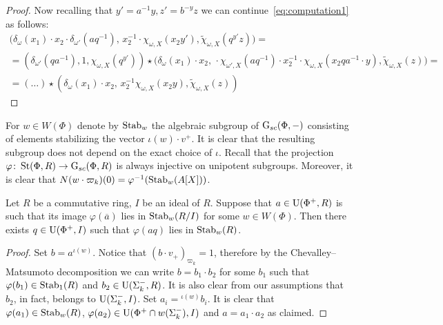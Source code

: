 \begin{proof}
Now recalling that $y' = a ^{-1} y, z' = b^{-y} z$ we can continue~\eqref{eq:computation1} as follows:
\begin{multline*}
 \bigl(\delta_\omega(x_1) \cdot x_2 \cdot \delta_{\omega'}(aq^{-1}),\, x_2^{-1}\cdot \chi_{\omega, X}(x_2 y'), \widetilde{\chi}_{\omega, X}(q^{y'} z) \bigr) = \\ = (\delta_{\omega'}(qa^{-1}), 1, \chi_{\omega, X}(q^{y'})) \star \bigl(\delta_\omega(x_1) \cdot x_2,\, \cdot \chi_{\omega', X}(aq^{-1}) \cdot x_2^{-1}\cdot \chi_{\omega, X}(x_2 q a^{-1} \cdot y ), \widetilde{\chi}_{\omega, X}(z) \bigr) = \\ = (\ldots) \star (\delta_\omega(x_1) \cdot x_2,\, x_2^{-1} \chi_{\omega, X}(x_2y), \widetilde{\chi}_{\omega, X}(z)) \end{multline*} \end{proof}


 For $w\in W(\Phi)$ denote by $\operatorname{Stab}_{w}$ the algebraic subgroup of $\operatorname{G}_{sc}(\Phi, -)$ consisting of elements stabilizing the vector $\iota(w) \cdot v^+$. It is clear that the resulting subgroup does not depend on the exact choice of $\iota$. Recall that the projection $\varphi \colon \operatorname{St}(\Phi, R) \to \operatorname{G}_{sc}(\Phi, R)$ is always injective on unipotent subgroups. Moreover, it is clear that $N(w \cdot \varpi_k)(0) = \varphi^{-1}(\operatorname{Stab}_w(A[X]))$.

\begin{lemma} \label{lem:q}
Let $R$ be a commutative ring, $I$ be an ideal of $R$.
Suppose that $a \in \operatorname{U}(\Phi^+, R)$ is such that its image $\varphi(\overline{a})$ lies in $\operatorname{Stab}_{w}(R/I)$ for some $w \in W(\Phi)$.
Then there exists $q \in \operatorname{U}(\Phi^+, I)$ such that $\varphi(aq)$ lies in $\operatorname{Stab}_{w}(R)$.
\end{lemma}
\begin{proof}
Set $b = a^{\iota(w)}$.
Notice that $(b \cdot v_+)_{\varpi_k} = 1$, therefore by the Chevalley--Matsumoto decomposition we can write $b = b_1 \cdot b_2$ for some $b_1$ such that $\varphi(b_1) \in \operatorname{Stab}_1(R)$ and $b_2 \in \operatorname{U}(\Sigma_k^-, R)$.
It is also clear from our assumptions that $b_2$, in fact, belongs to $\operatorname{U}(\Sigma_k^-, I)$.
Set $a_i = {}^{\iota(w)}b_i$.
It is clear that $\varphi(a_1) \in \operatorname{Stab}_w(R)$, $\varphi(a_2) \in \operatorname{U}(\Phi^+ \cap w(\Sigma_k^-), I)$ and $a = a_1 \cdot a_2$ as claimed.
\end{proof}
